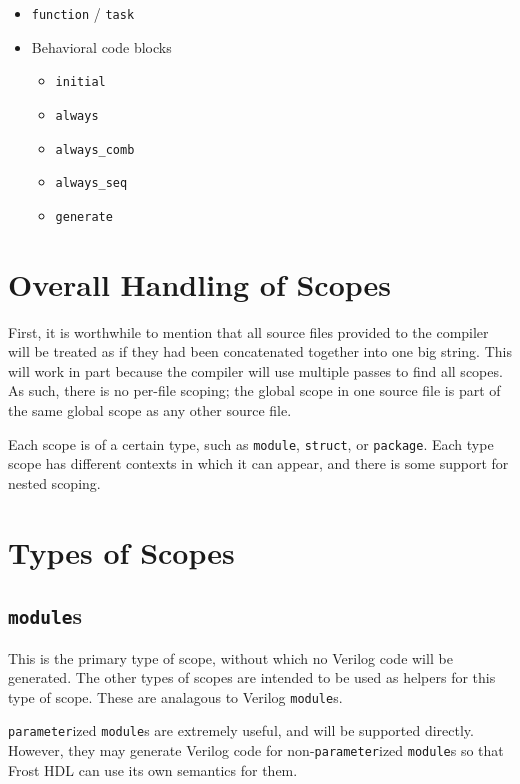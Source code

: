 \documentclass{article}
\begin{document}
\begin{itemize}
		\item \texttt{function} / \texttt{task}

		\item Behavioral code blocks
		\begin{itemize}
			\item \texttt{initial}
			\item \texttt{always}
			\item \texttt{always\_comb}
			\item \texttt{always\_seq}
			\item \texttt{generate}
		\end{itemize}
	\end{itemize}

	\newpage
	\doublespacing

	\section{Overall Handling of Scopes}
	First, it is worthwhile to mention that all source files provided to
	the compiler will be treated as if they had been concatenated together
	into one big string.  This will work in part because the compiler will
	use multiple passes to find all scopes.  As such, there is no per-file
	scoping; the global scope in one source file is part of the same global
	scope as any other source file.

	Each scope is of a certain type, such as \texttt{module},
	\texttt{struct}, or \texttt{package}.  Each type scope has different
	contexts in which it can appear, and there is some support for nested
	scoping.

	\section{Types of Scopes}

	\subsection{\texttt{module}s}

	This is the primary type of scope, without which no Verilog code will
	be generated.  The other types of scopes are intended to be used as
	helpers for this type of scope.  These are analagous to Verilog
	\texttt{module}s.

	\texttt{parameter}ized \texttt{module}s are extremely useful, and will
	be supported directly.  However, they may generate Verilog code for
	non-\texttt{parameter}ized \texttt{module}s so that Frost HDL can use
	its own semantics for them.
\end{document}
